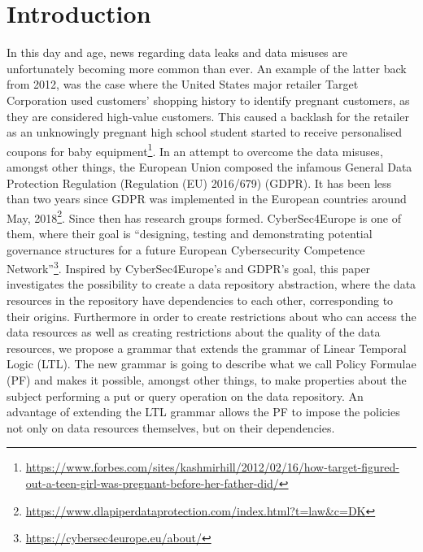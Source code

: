 \section{Introduction}
In this day and age, news regarding data leaks and data misuses are unfortunately becoming more common than ever. An example of the latter back from 2012, was the case where the United States major retailer Target Corporation used customers' shopping history to identify pregnant customers, as they are considered high-value customers. This caused a backlash for the retailer as an unknowingly pregnant high school student started to receive personalised coupons for baby equipment\footnote{\url{https://www.forbes.com/sites/kashmirhill/2012/02/16/how-target-figured-out-a-teen-girl-was-pregnant-before-her-father-did/}}. In an attempt to overcome the data misuses, amongst other things, the European Union composed the infamous General Data Protection Regulation (Regulation (EU) 2016/679) (GDPR). It has been less than two years since GDPR was implemented in the European countries around May, 2018\footnote{\url{https://www.dlapiperdataprotection.com/index.html?t=law&c=DK}}. Since then has research groups formed. CyberSec4Europe is one of them, where their goal is ``designing, testing and demonstrating potential governance structures for a future European Cybersecurity Competence Network''\footnote{\url{https://cybersec4europe.eu/about/}}. Inspired by CyberSec4Europe's and GDPR's goal, this paper investigates the possibility to create a data repository abstraction, where the data resources in the repository have dependencies to each other, corresponding to their origins. Furthermore in order to create restrictions about who can access the data resources as well as creating restrictions about the quality of the data resources, we propose a grammar that extends the grammar of Linear Temporal Logic (LTL). The new grammar is going to describe what we call Policy Formulae (PF) and makes it possible, amongst other things, to make properties about the subject performing a put or query operation on the data repository. An advantage of extending the LTL grammar allows the PF to impose the policies not only on data resources themselves, but on their dependencies.

